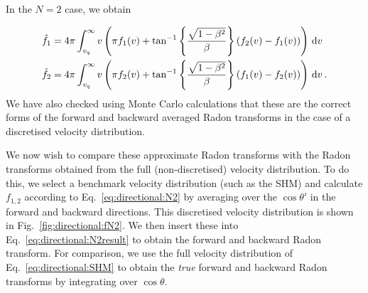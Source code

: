 
In the $N=2$ case, we obtain

\begin{align}
\label{eq:directional:N2result}
\hat{f}_1 &= 4\pi\int_{v_q}^{\infty} v \left( \pi f_1(v) + \tan^{-1}\left\{\frac{\sqrt{1-\beta^2}}{\beta}\right\}\left(f_2(v) - f_1(v)\right) \right) \, \mathrm{d}v \\
\hat{f}_2 &= 4\pi\int_{v_q}^{\infty} v \left( \pi f_2(v) + \tan^{-1}\left\{\frac{\sqrt{1-\beta^2}}{\beta}\right\}\left(f_1(v) - f_2(v)\right) \right) \, \mathrm{d}v\,.
\end{align}
We have also checked using Monte Carlo calculations that these are the correct forms of the forward and backward averaged Radon transforms in the case of a discretised velocity distribution.

We now wish to compare these approximate Radon transforms with the Radon transforms obtained from the full (non-discretised) velocity distribution. To do this, we select a benchmark velocity distribution (such as the SHM) and calculate $f_{1,2}$ according to Eq.~\ref{eq:directional:N2} by averaging over the $\cos\theta'$ in the forward and backward directions. This discretised velocity distribution is shown in Fig.~\ref{fig:directional:fN2}. We then insert these into Eq.~\ref{eq:directional:N2result} to obtain the forward and backward Radon transform. For comparison, we use the full velocity distribution of Eq.~\ref{eq:directional:SHM} to obtain the \textit{true} forward and backward Radon transforms by integrating over $\cos\theta$. 


